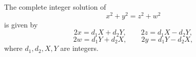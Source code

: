 \begin{proposition}
The complete integer solution of
\[
    x^2+y^2=z^2+w^2
\]
is given by
\[
    2x=d_1X+d_2Y,\qquad 2z=d_1X-d_2Y,
\]
\[
    2w=d_1Y+d_2X,\qquad 2y=d_1Y-d_2X,
\]
where $d_1,d_2,X,Y$ are integers.
\end{proposition}
